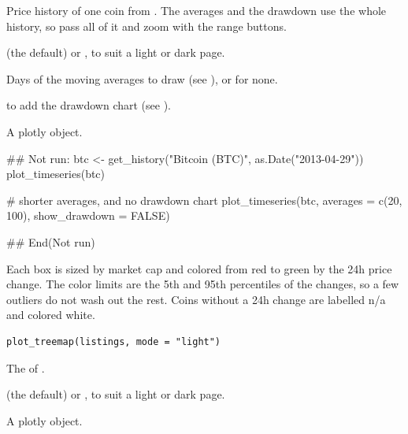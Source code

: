 \documentclass[a4paper]{book}
\begin{document}
\begin{Arguments}
\begin{ldescription}
\item[\code{history}] Price history of one coin from . The
averages and the drawdown use the whole history, so pass all of it and
zoom with the range buttons.

\item[\code{mode}]  (the default) or , to suit a light or dark
page.

\item[\code{averages}] Days of the moving averages to draw (see
), or  for none.

\item[\code{show\_drawdown}]  to add the drawdown chart (see ).
\end{ldescription}
\end{Arguments}
%
\begin{Value}
A plotly object.
\end{Value}
%
\begin{Examples}
\begin{ExampleCode}
## Not run: 
btc <- get_history("Bitcoin (BTC)", as.Date("2013-04-29"))
plot_timeseries(btc)

# shorter averages, and no drawdown chart
plot_timeseries(btc, averages = c(20, 100), show_drawdown = FALSE)

## End(Not run)
\end{ExampleCode}
\end{Examples}
%
\begin{Description}
Each box is sized by market cap and colored from red to green by the 24h
price change. The color limits are the 5th and 95th percentiles of the
changes, so a few outliers do not wash out the rest. Coins without a 24h
change are labelled n/a and colored white.
\end{Description}
%
\begin{Usage}
\begin{verbatim}
plot_treemap(listings, mode = "light")
\end{verbatim}
\end{Usage}
%
\begin{Arguments}
\begin{ldescription}
\item[\code{listings}] The  of .

\item[\code{mode}]  (the default) or , to suit a light or dark
page.
\end{ldescription}
\end{Arguments}
%
\begin{Value}
A plotly object.
\end{Value}
%
\begin{Examples}
\end{Examples}
\printindex{}
\end{document}
